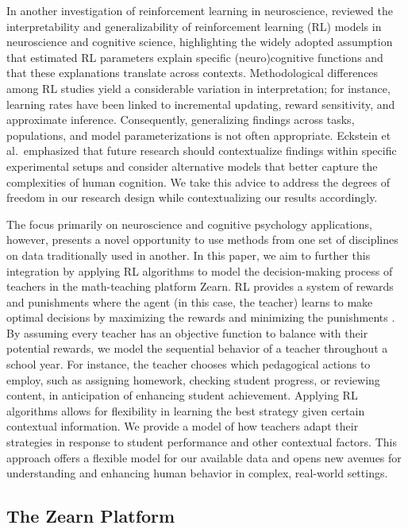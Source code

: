 \documentclass[
  number,
  preprint,
  3p,
  onecolumn]{elsarticle}
\begin{document}
In another investigation of reinforcement learning in neuroscience,
\citep{eckstein2021} reviewed the interpretability and generalizability
of reinforcement learning (RL) models in neuroscience and cognitive
science, highlighting the widely adopted assumption that estimated RL
parameters explain specific (neuro)cognitive functions and that these
explanations translate across contexts. Methodological differences among
RL studies yield a considerable variation in interpretation; for
instance, learning rates have been linked to incremental updating,
reward sensitivity, and approximate inference. Consequently,
generalizing findings across tasks, populations, and model
parameterizations is not often appropriate. Eckstein et al.~emphasized
that future research should contextualize findings within specific
experimental setups and consider alternative models that better capture
the complexities of human cognition. We take this advice to address the
degrees of freedom in our research design while contextualizing our
results accordingly.

The focus primarily on neuroscience and cognitive psychology
applications, however, presents a novel opportunity to use methods from
one set of disciplines on data traditionally used in another. In this
paper, we aim to further this integration by applying RL algorithms to
model the decision-making process of teachers in the math-teaching
platform Zearn. RL provides a system of rewards and punishments where
the agent (in this case, the teacher) learns to make optimal decisions
by maximizing the rewards and minimizing the punishments
\citep{sutton2018, kaelbling1996}. By assuming every teacher has an
objective function to balance with their potential rewards, we model the
sequential behavior of a teacher throughout a school year. For instance,
the teacher chooses which pedagogical actions to employ, such as
assigning homework, checking student progress, or reviewing content, in
anticipation of enhancing student achievement. Applying RL algorithms
allows for flexibility in learning the best strategy given certain
contextual information. We provide a model of how teachers adapt their
strategies in response to student performance and other contextual
factors. This approach offers a flexible model for our available data
and opens new avenues for understanding and enhancing human behavior in
complex, real-world settings.

\subsection{The Zearn Platform}\label{the-zearn-platform}
\end{document}

